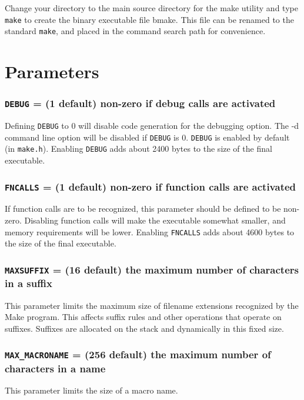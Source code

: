 Change your directory to the main source directory for the make utility and
type {\tt make} to create the binary executable file {bmake}.  This file
can be renamed to the standard {\tt make}, and placed in the command search
path for convenience.


\section{Parameters}

\subsubsection{{\tt DEBUG} = (1 default) non-zero if debug calls are
activated}

Defining {\tt DEBUG} to 0 will disable code generation for the debugging
option.  The -d command line option will be disabled if {\tt DEBUG} is 0.
{\tt DEBUG} is enabled by default (in {\tt make.h}).  Enabling {\tt DEBUG}
adds about 2400 bytes to the size of the final executable.

\subsubsection{{\tt FNCALLS} = (1 default) non-zero if function calls are
activated}

If function calls are to be recognized, this parameter should be defined to
be non-zero.  Disabling function calls will make the executable somewhat
smaller, and memory requirements will be lower.  Enabling {\tt FNCALLS}
adds about 4600 bytes to the size of the final executable.

\subsubsection{{\tt MAXSUFFIX} = (16 default) the maximum number of
characters in a suffix}

This parameter limits the maximum size of filename extensions recognized by
the Make program.  This affects suffix rules and other operations that
operate on suffixes.  Suffixes are allocated on the stack and dynamically
in this fixed size.

\subsubsection{{\tt MAX_MACRONAME} = (256 default) the maximum number of
characters in a name}

This parameter limits the size of a macro name.


